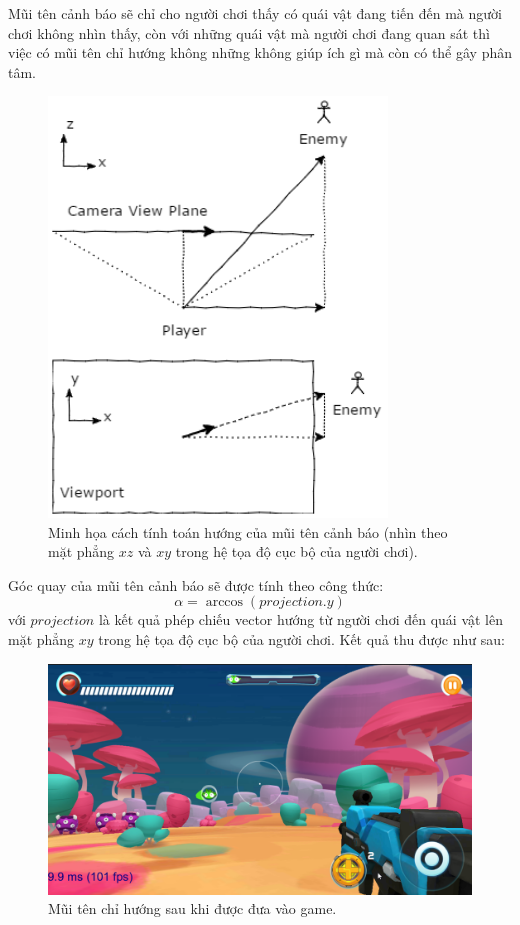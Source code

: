 \documentclass[12pt]{report}
\begin{document}
Mũi tên cảnh báo sẽ chỉ cho người chơi thấy có quái vật đang tiến đến mà người chơi không nhìn thấy, còn với những quái vật mà người chơi đang quan sát thì việc có mũi tên chỉ hướng không những không giúp ích gì mà còn có thể gây phân tâm.
\begin{figure}[H]
  \centering
    \includegraphics[width=9cm]{Pics/Chap5/indicator.png}
  \caption{Minh họa cách tính toán hướng của mũi tên cảnh báo (nhìn theo mặt phẳng $xz$ và $xy$ trong hệ tọa độ cục bộ của người chơi).}
\end{figure}

Góc quay của mũi tên cảnh báo sẽ được tính theo công thức:
\[ \alpha = \arccos (projection.y) \]
với $projection$ là kết quả phép chiếu vector hướng từ người chơi đến quái vật lên mặt phẳng $xy$ trong hệ tọa độ cục bộ của người chơi. Kết quả thu được như sau:
\begin{figure}[H]
  \centering
    \includegraphics[width=14cm]{Pics/Chap5/indicatordemo.png}
  \caption{Mũi tên chỉ hướng sau khi được đưa vào game.}
\end{figure}
\end{document}
